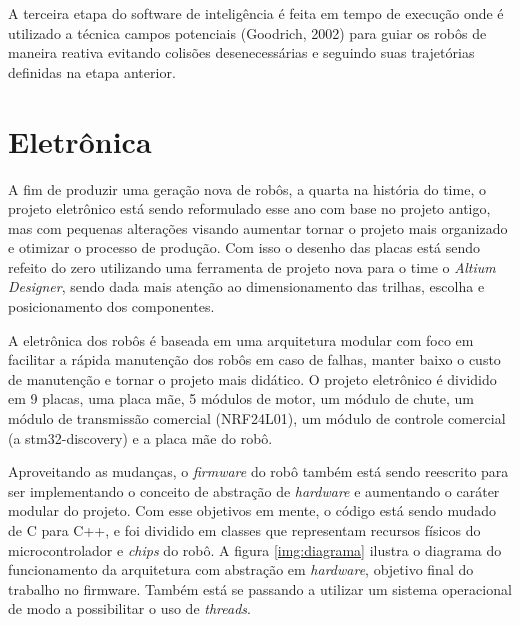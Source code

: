 \documentclass[conference]{IEEEtran}
\begin{document}
A terceira etapa do software de inteligência é feita em tempo de execução onde é utilizado a técnica campos potenciais (Goodrich, 2002)\cite{goodrich} para guiar os robôs de maneira reativa evitando colisões desenecessárias e seguindo suas trajetórias definidas na etapa anterior.

\section{Eletrônica}
A fim de produzir uma geração nova de robôs, a quarta na história do time, o projeto eletrônico está sendo reformulado esse ano com base no projeto antigo, mas com pequenas alterações visando aumentar tornar o projeto mais organizado e otimizar o processo de produção. Com isso o desenho das placas está sendo refeito do zero utilizando uma ferramenta de projeto nova para o time o \textit{Altium Designer}, sendo dada mais atenção ao dimensionamento das trilhas, escolha e posicionamento dos componentes.

A eletrônica dos robôs é baseada em uma arquitetura modular com foco em facilitar a rápida manutenção dos robôs em caso de falhas, manter baixo o custo de manutenção e tornar o projeto mais didático. O projeto eletrônico é dividido em 9 placas, uma placa mãe, 5 módulos de motor, um módulo de chute, um módulo de transmissão comercial (NRF24L01), um módulo de controle comercial (a stm32-discovery) e a placa mãe do robô.


Aproveitando as mudanças, o \textit{firmware} do robô também está sendo reescrito para ser implementando o conceito de abstração de \textit{hardware} e aumentando o caráter modular do projeto. Com esse objetivos em mente, o código está sendo mudado de C para C++, e foi dividido em classes que representam recursos físicos do microcontrolador e \textit{chips} do robô. A figura \ref{img:diagrama} ilustra o diagrama do funcionamento da arquitetura com abstração em \textit{hardware}, objetivo final do trabalho no firmware. Também está se passando a utilizar um sistema operacional de modo a possibilitar o uso de \textit{threads}.
\end{document}
